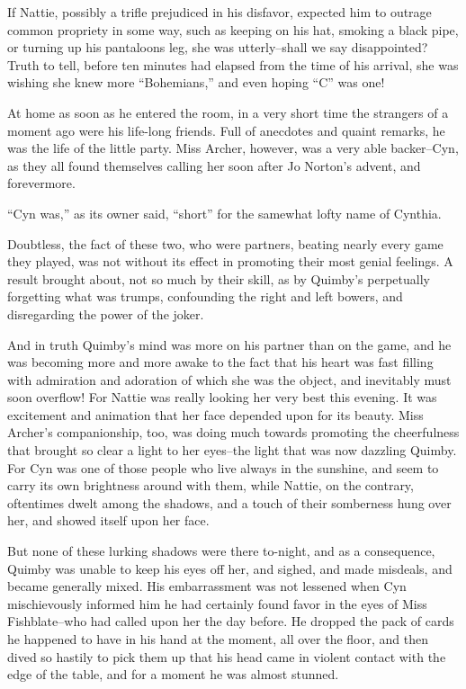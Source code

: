 If Nattie, possibly a trifle prejudiced in his disfavor, expected him to
outrage common propriety in some way, such as keeping on his hat,
smoking a black pipe, or turning up his pantaloons leg, she was
utterly--shall we say disappointed? Truth to tell, before ten minutes
had elapsed from the time of his arrival, she was wishing she knew more
``Bohemians,'' and even hoping ``C'' was one!

At home as soon as he entered the room, in a very short time the
strangers of a moment ago were his life-long friends. Full of anecdotes
and quaint remarks, he was the life of the little party. Miss Archer,
however, was a very able backer--Cyn, as they all found themselves
calling her soon after Jo Norton's advent, and forevermore.

``Cyn was,'' as its owner said, ``short'' for the samewhat lofty name of
Cynthia.

Doubtless, the fact of these two, who were partners, beating nearly
every game they played, was not without its effect in promoting their
most genial feelings. A result brought about, not so much by their
skill, as by Quimby's perpetually forgetting what was trumps,
confounding the right and left bowers, and disregarding the power of the
joker.

And in truth Quimby's mind was more on his partner than on the game, and
he was becoming more and more awake to the fact that his heart was fast
filling with admiration and adoration of which she was the object, and
inevitably must soon overflow! For Nattie was really looking her very
best this evening. It was excitement and animation that her face
depended upon for its beauty. Miss Archer's companionship, too, was
doing much towards promoting the cheerfulness that brought so clear a
light to her eyes--the light that was now dazzling Quimby. For Cyn was
one of those people who live always in the sunshine, and seem to carry
its own brightness around with them, while Nattie, on the contrary,
oftentimes dwelt among the shadows, and a touch of their somberness hung
over her, and showed itself upon her face.

But none of these lurking shadows were there to-night, and as a
consequence, Quimby was unable to keep his eyes off her, and sighed, and
made misdeals, and became generally mixed. His embarrassment was not
lessened when Cyn mischievously informed him he had certainly found
favor in the eyes of Miss Fishblate--who had called upon her the day
before. He dropped the pack of cards he happened to have in his hand at
the moment, all over the floor, and then dived so hastily to pick them
up that his head came in violent contact with the edge of the table, and
for a moment he was almost stunned.

